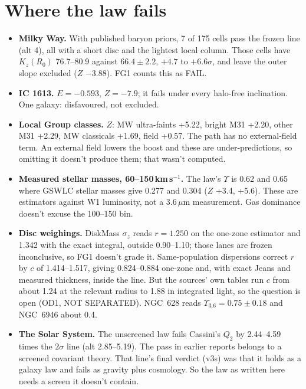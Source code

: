 \documentclass[10pt]{article}
\begin{document}
\section{Where the law fails}\label{sec:fails}
\begin{itemize}
\item \textbf{Milky Way.} With published baryon priors, 7 of 175 cells pass the frozen line (alt 4), all with a short disc and the lightest local column. Those cells have $K_z(R_0)$ 76.7--80.9 against $66.4\pm2.2$, $+4.7$ to $+6.6\sigma$, and leave the outer slope excluded ($Z$ $-3.88$). FG1 counts this as FAIL.
\item \textbf{IC 1613.} $E=-0.593$, $Z=-7.9$; it fails under every halo-free inclination. One galaxy: disfavoured, not excluded.
\item \textbf{Local Group classes.} $Z$: MW ultra-faints +5.22, bright M31 +2.20, other M31 +2.29, MW classicals +1.69, field +0.57. The path has no external-field term. An external field lowers the boost and these are under-predictions, so omitting it doesn't produce them; that wasn't computed.
\item \textbf{Measured stellar masses, 60--150\,km\,s$^{-1}$.} The law's $\Upsilon$ is 0.62 and 0.65 where GSWLC stellar masses give 0.277 and 0.304 ($Z$ +3.4, +5.6). These are estimators against W1 luminosity, not a 3.6\,$\mu$m measurement. Gas dominance doesn't excuse the 100--150 bin.
\item \textbf{Disc weighings.} DiskMass $\sigma_z$ reads $r=1.250$ on the one-zone estimator and 1.342 with the exact integral, outside 0.90--1.10; those lanes are frozen inconclusive, so FG1 doesn't grade it. Same-population dispersions \cite{A16,A18,A21} correct $r$ by $c$ of 1.414--1.517, giving 0.824--0.884 one-zone and, with exact Jeans and measured thickness, inside the line. But the sources' own tables run $c$ from about 1.24 at the relevant radius to 1.88 in integrated light, so the question is open (OD1, NOT SEPARATED). NGC~628 reads $\Upsilon_{3.6}=0.75\pm0.18$ and NGC~6946 about 0.4.
\item \textbf{The Solar System.} The unscreened law fails Cassini's $Q_2$ by 2.44--4.59 times the $2\sigma$ line (alt 2.85--5.19). The pass in earlier reports belongs to a screened covariant theory. That line's final verdict (v3s) was that it holds as a galaxy law and fails as gravity plus cosmology. So the law as written here needs a screen it doesn't contain.
\end{itemize}
\end{document}
